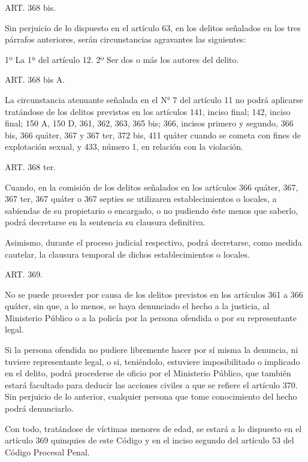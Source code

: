     ART. 368 bis.

    Sin perjuicio de lo dispuesto en el artículo 63, en los delitos señalados en los tres párrafos anteriores, serán circunstancias agravantes las siguientes:

    1º La 1ª del artículo 12.
    2º Ser dos o más los autores del delito.




    ART. 368 bis A.

    La circunstancia atenuante señalada en el N° 7 del artículo 11 no podrá aplicarse tratándose de los delitos previstos en los artículos 141, inciso final; 142, inciso final; 150 A, 150 D, 361, 362, 363, 365 bis; 366, incisos primero y segundo, 366 bis, 366 quáter, 367 y 367 ter, 372 bis, 411 quáter cuando se cometa con fines de explotación sexual, y 433, número 1, en relación con la violación.


    ART. 368 ter.

    Cuando, en la comisión de los delitos señalados en los artículos 366 quáter, 367, 367 ter, 367 quáter o 367 septies se utilizaren establecimientos o locales, a sabiendas de su propietario o encargado, o no pudiendo éste menos que saberlo, podrá decretarse en la sentencia su clausura definitiva.

    Asimismo, durante el proceso judicial respectivo, podrá decretarse, como medida cautelar, la clausura temporal de dichos establecimientos o locales.



    ART. 369.

    No se puede proceder por causa de los delitos previstos en los artículos 361 a 366 quáter, sin que, a lo menos, se haya denunciado el hecho a la justicia, al Ministerio Público o a la policía por la persona ofendida o por su representante legal.

    Si la persona ofendida no pudiere libremente hacer por sí misma la denuncia, ni tuviere representante legal, o si, teniéndolo, estuviere imposibilitado o implicado en el delito, podrá procederse de oficio por el Ministerio Público, que también estará facultado para deducir las acciones civiles a que se refiere el artículo 370. Sin perjuicio de lo anterior, cualquier persona que tome conocimiento del hecho podrá denunciarlo.

    Con todo, tratándose de víctimas menores de edad, se estará a lo dispuesto en el artículo 369 quinquies de este Código y en el inciso segundo del artículo 53 del Código Procesal Penal.

